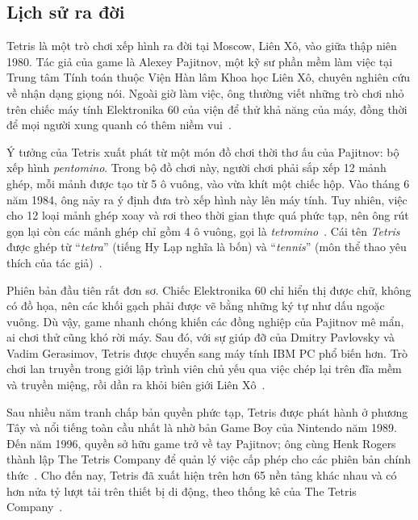 
\providecommand{\khoitetromino}[2]{%
  \foreach \x/\y in {#1}{%
    \draw[fill=black!#2,line width=0.6pt] (\x*0.5,\y*0.5) rectangle ++(0.5,0.5);}}

\subsection{Lịch sử ra đời}

Tetris là một trò chơi xếp hình ra đời tại Moscow, Liên Xô, vào giữa thập niên 1980. Tác giả của game là Alexey Pajitnov, một kỹ sư phần mềm làm việc tại Trung tâm Tính toán thuộc Viện Hàn lâm Khoa học Liên Xô, chuyên nghiên cứu về nhận dạng giọng nói. Ngoài giờ làm việc, ông thường viết những trò chơi nhỏ trên chiếc máy tính Elektronika 60 của viện để thử khả năng của máy, đồng thời để mọi người xung quanh có thêm niềm vui~\cite{tetris_wiki,tetris_myjoy}.

Ý tưởng của Tetris xuất phát từ một món đồ chơi thời thơ ấu của Pajitnov: bộ xếp hình \textit{pentomino}. Trong bộ đồ chơi này, người chơi phải sắp xếp 12 mảnh ghép, mỗi mảnh được tạo từ 5 ô vuông, vào vừa khít một chiếc hộp. Vào tháng 6 năm 1984, ông nảy ra ý định đưa trò xếp hình này lên máy tính. Tuy nhiên, việc cho 12 loại mảnh ghép xoay và rơi theo thời gian thực quá phức tạp, nên ông rút gọn lại còn các mảnh ghép chỉ gồm 4 ô vuông, gọi là \textit{tetromino}~\cite{guardian_tetris,tetris_wiki}. Cái tên \textit{Tetris} được ghép từ ``\textit{tetra}'' (tiếng Hy Lạp nghĩa là bốn) và ``\textit{tennis}'' (môn thể thao yêu thích của tác giả)~\cite{filfre_tetris}.

Phiên bản đầu tiên rất đơn sơ. Chiếc Elektronika 60 chỉ hiển thị được chữ, không có đồ họa, nên các khối gạch phải được vẽ bằng những ký tự như dấu ngoặc vuông. Dù vậy, game nhanh chóng khiến các đồng nghiệp của Pajitnov mê mẩn, ai chơi thử cũng khó rời máy. Sau đó, với sự giúp đỡ của Dmitry Pavlovsky và Vadim Gerasimov, Tetris được chuyển sang máy tính IBM PC phổ biến hơn. Trò chơi lan truyền trong giới lập trình viên chủ yếu qua việc chép lại trên đĩa mềm và truyền miệng, rồi dần ra khỏi biên giới Liên Xô~\cite{denofgeek_tetris,tetris_myjoy}.

Sau nhiều năm tranh chấp bản quyền phức tạp, Tetris được phát hành ở phương Tây và nổi tiếng toàn cầu nhất là nhờ bản Game Boy của Nintendo năm 1989. Đến năm 1996, quyền sở hữu game trở về tay Pajitnov; ông cùng Henk Rogers thành lập The Tetris Company để quản lý việc cấp phép cho các phiên bản chính thức~\cite{tetris_wiki,tetris_myjoy}. Cho đến nay, Tetris đã xuất hiện trên hơn 65 nền tảng khác nhau và có hơn nửa tỷ lượt tải trên thiết bị di động, theo thống kê của The Tetris Company~\cite{tetris_myjoy}.

